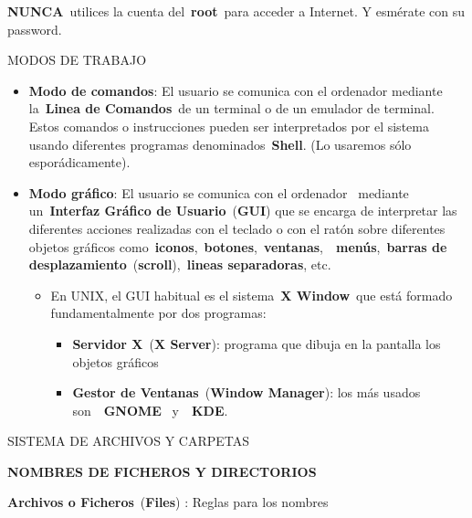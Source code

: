 \documentclass[
  letterpaper,
]{article}
\providecommand{\tightlist}{%
  \setlength{\itemsep}{0pt}\setlength{\parskip}{0pt}}\usepackage{longtable,booktabs,array}
\begin{document}
\textbf{NUNCA}~utilices la cuenta del~\textbf{root}~para acceder a
Internet. Y esmérate con su password.

MODOS DE TRABAJO

\begin{itemize}
\item
  \textbf{Modo de comandos}: El usuario se comunica con el ordenador
  mediante la~\textbf{Linea de Comandos}~de un terminal o de un emulador
  de terminal. Estos comandos o instrucciones pueden ser interpretados
  por el sistema usando diferentes programas denominados~\textbf{Shell}.
  (Lo usaremos sólo esporádicamente).
\item
  \textbf{Modo gráfico}: El usuario se comunica con el ordenador~
  mediante un~\textbf{Interfaz Gráfico de Usuario}~(\textbf{GUI}) que se
  encarga de interpretar las diferentes acciones realizadas con el
  teclado o con el ratón sobre diferentes objetos gráficos
  como~\textbf{iconos},~\textbf{botones},~\textbf{ventanas},~~\textbf{menús},~\textbf{barras
  de desplazamiento}~(\textbf{scroll}),~\textbf{lineas separadoras},
  etc.

  \begin{itemize}
  \tightlist
  \item
    En UNIX, el GUI habitual es el sistema~\textbf{X Window}~que está
    formado fundamentalmente por dos programas:

    \begin{itemize}
    \tightlist
    \item
      \textbf{Servidor X}~(\textbf{X Server}): programa que dibuja en la
      pantalla los objetos gráficos
    \item
      \textbf{Gestor de Ventanas}~(\textbf{Window Manager}): los más
      usados son~~\textbf{GNOME}~ y~~\textbf{KDE}.
    \end{itemize}
  \end{itemize}
\end{itemize}

SISTEMA DE ARCHIVOS Y CARPETAS

\textbf{NOMBRES DE FICHEROS Y DIRECTORIOS}

\textbf{Archivos o Ficheros}~(\textbf{Files}) : Reglas para los nombres
\end{document}
